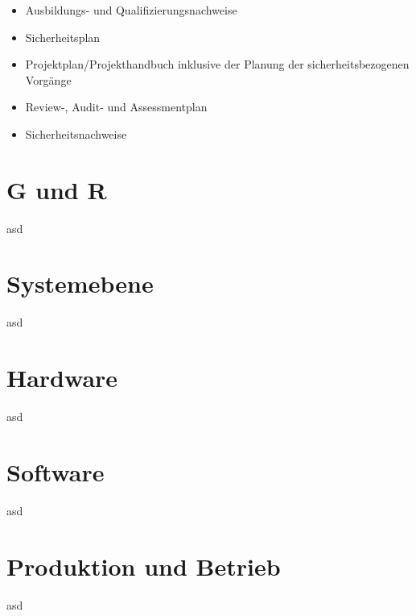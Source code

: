 \documentclass[a4paper,DIV=calc,ngerman]{scrartcl}
\begin{document}
\begin{itemize}
    \item Ausbildungs- und Qualifizierungsnachweise
    \item Sicherheitsplan
    \item Projektplan/Projekthandbuch inklusive der Planung der sicherheitsbezogenen Vorgänge
    \item Review-, Audit- und Assessmentplan
    \item Sicherheitsnachweise
\end{itemize}






\section{G und R}
\label{sec:GundR}
asd




\section{Systemebene}
\label{sec:Systemebene}
asd




\section{Hardware}
\label{sec:Hardware}
asd




\section{Software}
\label{sec:Software}
asd




\section{Produktion und Betrieb}
\label{sec:}
asd
\end{document}
